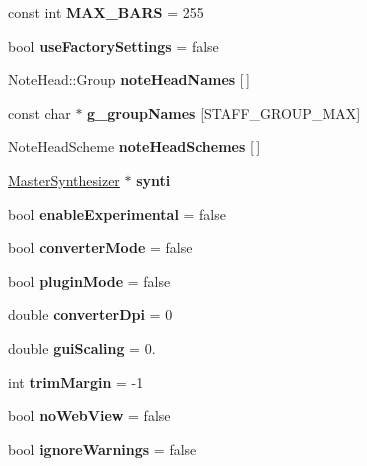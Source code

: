 \begin{DoxyCompactItemize}
const int {\bfseries M\+A\+X\+\_\+\+B\+A\+RS} = 255
\item 
\mbox{\label{namespace_ms_adecfde73beb9639310b6b6373c7a12ae}} 
bool {\bfseries use\+Factory\+Settings} = false
\item 
Note\+Head\+::\+Group {\bfseries note\+Head\+Names} \mbox{[}$\,$\mbox{]}
\item 
const char $\ast$ {\bfseries g\+\_\+group\+Names} \mbox{[}S\+T\+A\+F\+F\+\_\+\+G\+R\+O\+U\+P\+\_\+\+M\+AX\mbox{]}
\item 
Note\+Head\+Scheme {\bfseries note\+Head\+Schemes} \mbox{[}$\,$\mbox{]}
\item 
\mbox{\label{namespace_ms_ad30dd575483e2daabd5f3bf5b786dd4d}} 
\hyperlink{class_ms_1_1_master_synthesizer}{Master\+Synthesizer} $\ast$ {\bfseries synti}
\item 
\mbox{\label{namespace_ms_a80af7e281899de1319da9691bc9c13bd}} 
bool {\bfseries enable\+Experimental} = false
\item 
\mbox{\label{namespace_ms_a9e76bd253cc84b05294834c6315451ab}} 
bool {\bfseries converter\+Mode} = false
\item 
\mbox{\label{namespace_ms_ad35a342cf54d88a43521630c35a61170}} 
bool {\bfseries plugin\+Mode} = false
\item 
\mbox{\label{namespace_ms_a61721682543088632577217a4e22a7ca}} 
double {\bfseries converter\+Dpi} = 0
\item 
\mbox{\label{namespace_ms_ab0089adec81adcf0ea36771fb20156e9}} 
double {\bfseries gui\+Scaling} = 0.
\item 
\mbox{\label{namespace_ms_a7c50e3feb1dccf3b9343bbf7bb25ba2b}} 
int {\bfseries trim\+Margin} = -\/1
\item 
\mbox{\label{namespace_ms_aa733f4f1c2e832fca4547314f8efb9dd}} 
bool {\bfseries no\+Web\+View} = false
\item 
\mbox{\label{namespace_ms_abc7dbf927a238235454a079264827001}} 
bool {\bfseries ignore\+Warnings} = false

\end{DoxyCompactItemize}
